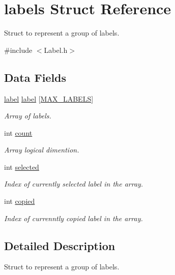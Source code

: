 \hypertarget{structlabels}{}\section{labels Struct Reference}
\label{structlabels}


Struct to represent a group of labels.  




{\ttfamily \#include $<$Label.\+h$>$}

\subsection*{Data Fields}
\begin{DoxyCompactItemize}
\item 
\mbox{\label{structlabels_aff99bcf93a20d26d511d0d4462099cb0}} 
\hyperlink{structlabel}{label} \hyperlink{structlabels_aff99bcf93a20d26d511d0d4462099cb0}{label} \mbox{[}\hyperlink{Label_8h_af3aacb96d65013368831751be391d3e9}{M\+A\+X\+\_\+\+L\+A\+B\+E\+LS}\mbox{]}
\begin{DoxyCompactList}\small\item\em Array of labels. \end{DoxyCompactList}\item 
\mbox{\label{structlabels_ac03271a71b21683455b1b05d637f359a}} 
int \hyperlink{structlabels_ac03271a71b21683455b1b05d637f359a}{count}
\begin{DoxyCompactList}\small\item\em Array logical dimention. \end{DoxyCompactList}\item 
int \hyperlink{structlabels_add7d8df7e0814e1e1c5aec4b626b8065}{selected}
\begin{DoxyCompactList}\small\item\em Index of currently selected label in the array. \end{DoxyCompactList}\item 
int \hyperlink{structlabels_ab616dbd228089b53455d264a9962ffbb}{copied}
\begin{DoxyCompactList}\small\item\em Index of currenntly copied label in the array. \end{DoxyCompactList}\end{DoxyCompactItemize}


\subsection{Detailed Description}
Struct to represent a group of labels. 

